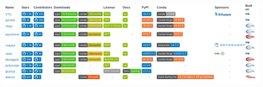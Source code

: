 \documentclass[t]{beamer}
\begin{document}
\begin{frame}
\begin{center}
        \vspace{10pt}
        \href{https://pyviz.org/tools.html}{\includegraphics[width=1.0\textwidth]{figures/overview_sciviz_trans.png}}

    \end{center}

\end{frame}

\end{document}
